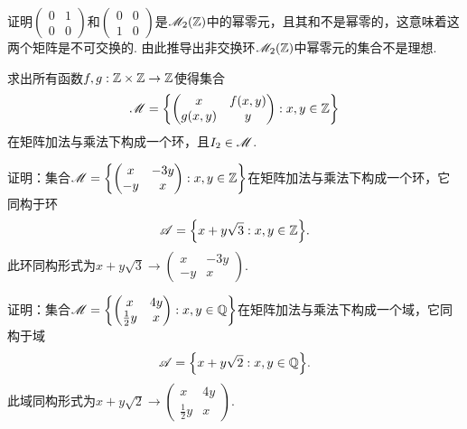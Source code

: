 \begin{problem}
  \cite[p.25]{17} 证明$\begin{pmatrix}
    0 & 1 \\
    0 & 0
  \end{pmatrix}$和$\begin{pmatrix}
    0 & 0 \\
    1 & 0
  \end{pmatrix}$是$\mathscr M_2(\mathbb Z)$中的幂零元，且其和不是幂零的，这意味着这两个矩阵是不可交换的. 由此推导出非交换环$\mathscr M_2(\mathbb Z)$中幂零元的集合不是理想.
\end{problem}

\begin{mybox}
  \begin{problem}
    求出所有函数$f,g:\mathbb Z\times\mathbb Z\to\mathbb Z$使得集合
    \[
      \MM = \left\{
        \begin{pmatrix}
          x & f(x,y) \\
          g(x,y) & y
        \end{pmatrix}:x,y\in\MZ
      \right\}
    \]
    在矩阵加法与乘法下构成一个环，且$I_2\in\mathscr M$.
  \end{problem}
\end{mybox}

\begin{problem}
  证明：集合$\MM=\left\{
    \begin{pmatrix}
      x & -3y\\
      -y & x
    \end{pmatrix}:x,y\in\MZ
  \right\}$在矩阵加法与乘法下构成一个环，它同构于环
  \[
    \mathscr A = \left\{x+y\sqrt 3:x,y\in\MZ\right\}.
  \]
  此环同构形式为$x+y\sqrt3\longrightarrow\begin{pmatrix}
      x & -3y\\
      -y & x
    \end{pmatrix}$.
\end{problem}

\begin{problem}
  证明：集合$\MM=\left\{
    \begin{pmatrix}
      x & 4y\\
      \frac12y & x
    \end{pmatrix}:x,y\in\MQ
  \right\}$在矩阵加法与乘法下构成一个域，它同构于域
  \[
    \mathscr A = \left\{x+y\sqrt2:x,y\in\MQ\right\}.
  \]
  此域同构形式为$x+y\sqrt2\longrightarrow\begin{pmatrix}
      x & 4y\\
      \frac12y & x
    \end{pmatrix}$.
\end{problem}

